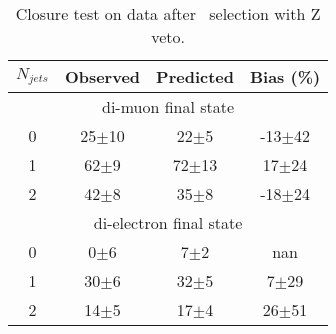 \begin{table}[!ht]
\begin{center}
\begin{tabular} {|c|ccc|}
\hline
$N_{jets}$  & Observed & Predicted & Bias (\%) \\
\hline 
\hline
\multicolumn{4}{|c|}{di-muon final state} \\
\hline
0 & 25$\pm$10 & 22$\pm$5  & -13$\pm$42 \\
1 & 62$\pm$9  & 72$\pm$13 &  17$\pm$24 \\
2 & 42$\pm$8  & 35$\pm$8  & -18$\pm$24 \\
\hline 
\hline
\multicolumn{4}{|c|}{di-electron final state} \\
\hline
0 &  0$\pm$6 &  7$\pm$2 &    nan    \\
1 & 30$\pm$6 & 32$\pm$5 &  7$\pm$29 \\
2 & 14$\pm$5 & 17$\pm$4 & 26$\pm$51 \\
\hline 
\end{tabular}
\caption{Closure test on data after  \GeVcc\ selection with Z veto.}
\label{tab:data_closure_120_zv}
\end{center}
\end{table}

\clearpage

